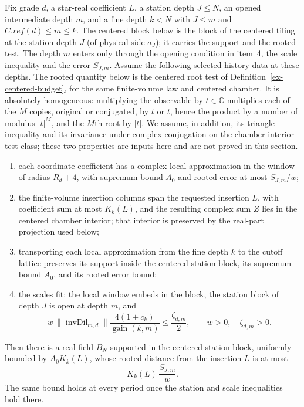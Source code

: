 \begin{proposition}
\label{prop:ex-public-origin}
Fix grade $d$, a star-real coefficient $L$, a station depth $J\leq N$, an
opened intermediate depth $m$, and a fine depth $k<N$ with
$J\leq m$ and $C.ref(d)\leq m\leq k$. The centered block below is the block of
the centered tiling at the station depth $J$ (of physical side $a_J$); it
carries the support and the rooted test. The depth $m$ enters only through the
opening condition in item~4, the scale inequality and the error
$S_{J,m}$. Assume the
following selected-history data at these depths. The rooted quantity below
is the centered root test of Definition~\ref{ex-centered-budget}, for the
same finite-volume law and centered chamber. It is absolutely homogeneous:
multiplying the observable by $t\in\mathbb C$ multiplies each of the $M$
copies, original or conjugated, by $t$ or $\bar t$, hence the product by a
number of modulus $|t|^M$, and the $M$th root by $|t|$. We assume, in
addition, its triangle inequality and its invariance under complex
conjugation on the chamber-interior test class; these two properties are
inputs here and are not proved in this section.
\begin{enumerate}
\item each coordinate coefficient has a complex local approximation in the
      window of radius $R_d+4$, with supremum bound $A_0$ and rooted error at
      most $S_{J,m}/w$;
\item the finite-volume insertion columns span the requested insertion $L$,
      with coefficient sum at most $K_k(L)$, and the resulting complex sum
      $Z$ lies in the centered chamber interior; that interior is preserved
      by the real-part projection used below;
\item transporting each local approximation from the fine depth $k$ to the
      cutoff lattice preserves its support inside the centered station block,
      its supremum bound $A_0$, and its rooted error bound;
\item the scales fit: the local window embeds in the block, the station block
      of depth $J$ is open at depth $m$, and
\[
 w\,\|\operatorname{invDil}_{m,d}\|
       \frac{4(1+c_k)}{\operatorname{gain}(k,m)}
       \leq \frac{\zeta_{d,m}}2,
 \qquad w>0,\quad \zeta_{d,m}>0.
\]
\end{enumerate}
Then there is a real field $B_N$ supported in the centered station block, uniformly
bounded by $A_0K_k(L)$, whose rooted distance from the insertion $L$ is at
most
\[
                       K_k(L)\,\frac{S_{J,m}}w.
\]
The same bound holds at every period once the station and scale inequalities
hold there.
\end{proposition}

